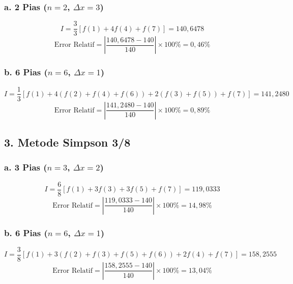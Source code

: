 \documentclass{article}
\begin{document}
\begin{enumerate}
\begin{itemize}
        \subsubsection*{a. 2 Pias ($n=2$, $\Delta x=3$)}
        \[
        I = \frac{3}{3} \left[ f(1) + 4f(4) + f(7) \right] = \boxed{140,6478}
        \]
        \[
        \text{Error Relatif} = \left| \frac{140,6478 - 140}{140} \right| \times 100\% = \boxed{0,46\%}
        \]

        \subsubsection*{b. 6 Pias ($n=6$, $\Delta x=1$)}
        \[
        I = \frac{1}{3} \left[ f(1) + 4(f(2)+f(4)+f(6)) + 2(f(3)+f(5)) + f(7) \right] = \boxed{141,2480}
        \]
        \[
        \text{Error Relatif} = \left| \frac{141,2480 - 140}{140} \right| \times 100\% = \boxed{0,89\%}
        \]

        \subsection*{3. Metode Simpson 3/8}
        \subsubsection*{a. 3 Pias ($n=3$, $\Delta x=2$)}
        \[
        I = \frac{6}{8} \left[ f(1) + 3f(3) + 3f(5) + f(7) \right] = \boxed{119,0333}
        \]
        \[
        \text{Error Relatif} = \left| \frac{119,0333 - 140}{140} \right| \times 100\% = \boxed{14,98\%}
        \]

        \subsubsection*{b. 6 Pias ($n=6$, $\Delta x=1$)}
        \[
        I = \frac{3}{8} \left[ f(1) + 3(f(2)+f(3)+f(5)+f(6)) + 2f(4) + f(7) \right] = \boxed{158,2555}
        \]
        \[
        \text{Error Relatif} = \left| \frac{158,2555 - 140}{140} \right| \times 100\% = \boxed{13,04\%}
        \]


\end{itemize}
\end{enumerate}
\end{document}

